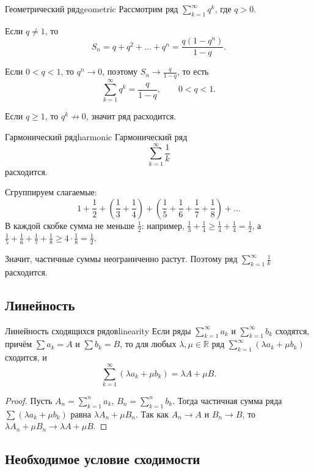 \begin{Example}{Геометрический ряд}{geometric}
	Рассмотрим ряд $\sum\limits_{k=1}^{\infty} q^k$, где $q > 0$.
	
	Если $q \neq 1$, то
	\[
	S_n = q + q^2 + \dots + q^n = \frac{q(1-q^n)}{1-q}.
	\]
	
	Если $0 < q < 1$, то $q^n \to 0$, поэтому $S_n \to \frac{q}{1-q}$, то есть
	\[
	\sum_{k=1}^{\infty} q^k = \frac{q}{1-q}, \qquad 0 < q < 1.
	\]
	
	Если $q \ge 1$, то $q^k \not\to 0$, значит ряд расходится.
\end{Example}

\begin{Example}{Гармонический ряд}{harmonic}
	Гармонический ряд
	\[
	\sum_{k=1}^{\infty} \frac1k
	\]
	расходится.
	
	Сгруппируем слагаемые:
	\[
	1 + \frac12
	+
	\left(\frac13+\frac14\right)
	+
	\left(\frac15+\frac16+\frac17+\frac18\right)
	+\dots
	\]
	В каждой скобке сумма не меньше $\frac12$: например, $\frac13+\frac14 \ge \frac14+\frac14 = \frac12$, а $\frac15+\frac16+\frac17+\frac18 \ge 4\cdot\frac18 = \frac12$.
	
	Значит, частичные суммы неограниченно растут. Поэтому ряд $\sum\limits_{k=1}^{\infty} \frac1k$ расходится.
\end{Example}

\subsection{Линейность}

\begin{Proposition}{Линейность сходящихся рядов}{linearity}
	Если ряды $\sum\limits_{k=1}^{\infty} a_k$ и $\sum\limits_{k=1}^{\infty} b_k$ сходятся, причём $\sum a_k = A$ и $\sum b_k = B$, то для любых $\lambda,\mu \in \mathbb{R}$ ряд $\sum\limits_{k=1}^{\infty}(\lambda a_k+\mu b_k)$ сходится, и
	\[
	\sum_{k=1}^{\infty}(\lambda a_k+\mu b_k)
	=
	\lambda A+\mu B.
	\]
\end{Proposition}

\begin{proof}
	Пусть $A_n = \sum\limits_{k=1}^{n} a_k$, $B_n = \sum\limits_{k=1}^{n} b_k$. Тогда частичная сумма ряда $\sum(\lambda a_k+\mu b_k)$ равна $\lambda A_n+\mu B_n$. Так как $A_n \to A$ и $B_n \to B$, то $\lambda A_n+\mu B_n \to \lambda A+\mu B$.
\end{proof}

\subsection{Необходимое условие сходимости}

